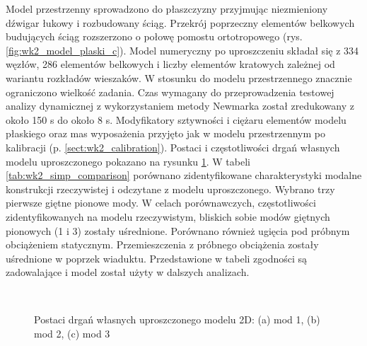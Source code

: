 Model przestrzenny sprowadzono do płaszczyzny przyjmując niezmieniony dźwigar łukowy i rozbudowany ściąg. Przekrój poprzeczny elementów belkowych budujących ściąg rozszerzono o połowę pomostu ortotropowego (rys. \ref{fig:wk2_model_plaski_c}). Model numeryczny po uproszczeniu składał się z 334 węzłów, 286 elementów belkowych i liczby elementów kratowych zależnej od wariantu rozkładów wieszaków. W stosunku do modelu przestrzennego znacznie ograniczono wielkość zadania. Czas wymagany do przeprowadzenia testowej analizy dynamicznej z wykorzystaniem metody Newmarka został zredukowany z około 150 s do około 8 s. Modyfikatory sztywności i ciężaru elementów modelu płaskiego oraz mas wyposażenia przyjęto jak w modelu przestrzennym po kalibracji (p. \ref{sect:wk2_calibration}). Postaci i częstotliwości drgań własnych modelu uproszczonego pokazano na rysunku \ref{fig:wk2_upr_mods}. W tabeli \ref{tab:wk2_simp_comparison} porównano zidentyfikowane charakterystyki modalne konstrukcji rzeczywistej i odczytane z modelu uproszczonego. Wybrano trzy pierwsze giętne pionowe mody. W celach porównawczych, częstotliwości zidentyfikowanych na modelu rzeczywistym, bliskich sobie modów giętnych pionowych (1 i 3) zostały uśrednione. Porównano również ugięcia pod próbnym obciążeniem statycznym. Przemieszczenia z próbnego obciążenia zostały uśrednione w poprzek wiaduktu.
Przedstawione w tabeli zgodności są zadowalające i model został użyty w dalszych analizach.





\begin{figure}[hbt!]
	\centering
	\\
	\captionsetup{justification=centering}
	\caption{Postaci drgań własnych uproszczonego modelu 2D: (a) mod 1, (b) mod 2, (c) mod 3}
	\label{fig:wk2_upr_mods}
\end{figure}


